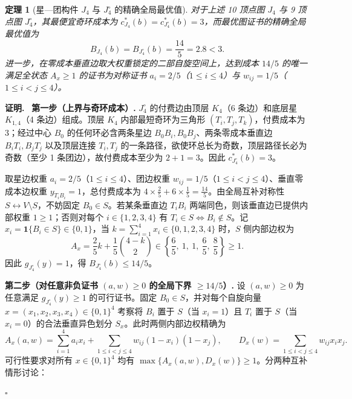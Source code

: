 \documentclass[11pt,a4paper]{ctexart}
\newtheorem{theorem}{定理}[section]
\theoremstyle{definition}
\newenvironment{proofcn}{\par\noindent\textbf{证明.}\ }{\hfill$\square$\par}
\newcommand{\1}{\boldsymbol 1}
\newcommand{\0}{\boldsymbol 0}
\begin{document}
\begin{theorem}[星—团构件 $J_4$ 与 $J_4^\circ$ 的精确全局最优值]\label{thm:J4_exact}
对于上述 10 顶点图 $J_4$ 与 9 顶点图 $J_4^\circ$，其最便宜奇环成本为 $c_{J_4}^*(b)=c_{J_4^\circ}^*(b)=3$，而最优图证书的精确全局最优值为
\begin{equation}\label{eq:J4_val}
 \boxed{B_{J_4}(b)=B_{J_4^\circ}(b)=\frac{14}{5}=2.8<3.}
\end{equation}
进一步，在零成本垂直边取大权重锁定的二部自旋空间上，达到成本 $14/5$ 的唯一满足全状态 $A_x\ge 1$ 的证书为对称证书 $a_i=2/5$（$1\le i\le 4$）与 $w_{ij}=1/5$（$1\le i<j\le 4$）。
\end{theorem}
\begin{proofcn}
\textbf{第一步（上界与奇环成本）.}
$J_4^\circ$ 的付费边由顶层 $K_4$（6 条边）和底层星 $K_{1,4}$（4 条边）组成。顶层 $K_4$ 内部最短奇环为三角形 $(T_i,T_j,T_k)$，付费成本为 $3$；经过中心 $B_0$ 的任何环必含两条星边 $B_0B_i,B_0B_j$、两条零成本垂直边 $B_iT_i,B_jT_j$ 以及顶层连接 $T_i,T_j$ 的一条路径，欲使环总长为奇数，顶层路径长必为奇数（至少 1 条团边），故付费成本至少为 $2+1=3$。因此 $c_{J_4^\circ}^*(b)=3$。

取星边权重 $a_i=2/5$（$1\le i\le 4$）、团边权重 $w_{ij}=1/5$（$1\le i<j\le 4$）、垂直零成本边权重 $y_{T_iB_i}=1$，总付费成本为 $4\times\frac{2}{5}+6\times\frac{1}{5}=\frac{14}{5}$。由全局互补对称性 $S\leftrightarrow V\setminus S$，不妨固定 $B_0\in S$。若某条垂直边 $T_iB_i$ 两端同色，则该垂直边已提供内部权重 $1\ge 1$；否则对每个 $i\in\{1,2,3,4\}$ 有 $T_i\in S\iff B_i\notin S$。记 $x_i=\1\{B_i\in S\}\in\{0,1\}$，当 $k=\sum_{i=1}^4 x_i\in\{0,1,2,3,4\}$ 时，$S$ 侧内部边权为
\[
 A_x=\frac{2}{5}k+\frac{1}{5}\binom{4-k}{2}\in\left\{\frac{6}{5},\ 1,\ 1,\ \frac{6}{5},\ \frac{8}{5}\right\}\ge 1.
\]
因此 $g_{J_4^\circ}(y)=1$，得 $B_{J_4^\circ}(b)\le 14/5$。

\medskip
\noindent\textbf{第二步（对任意非负证书 $(a,w)\ge 0$ 的全局下界 $\ge 14/5$）.}
设 $(a,w)\ge 0$ 为任意满足 $g_{J_4^\circ}(y)\ge 1$ 的可行证书。固定 $B_0\in S$，并对每个自旋向量 $x=(x_1,x_2,x_3,x_4)\in\{0,1\}^4$ 考察将 $B_i$ 置于 $S$（当 $x_i=1$）且 $T_i$ 置于 $S$（当 $x_i=0$）的合法垂直异色划分 $S_x$。此时两侧内部边权精确为
\begin{equation}\label{eq:J4_AD}
 A_x(a,w)=\sum_{i=1}^4 a_i x_i + \sum_{1\le i<j\le 4} w_{ij}(1-x_i)(1-x_j),\qquad
 D_x(w)=\sum_{1\le i<j\le 4} w_{ij} x_i x_j.
\end{equation}
可行性要求对所有 $x\in\{0,1\}^4$ 均有 $\max\{A_x(a,w),D_x(w)\}\ge 1$。分两种互补情形讨论：


\end{proofcn}
\end{document}
